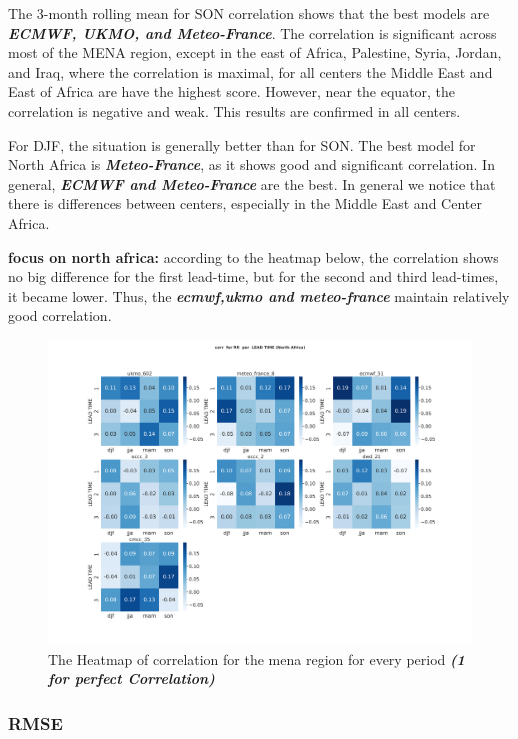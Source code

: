 The 3-month rolling mean for SON correlation shows that the best models are \textbf{\textit{ECMWF, UKMO, and Meteo-France}}. The correlation is significant across most of the MENA region, except in the east of Africa, Palestine, Syria, Jordan, and Iraq, where the correlation is maximal, for all centers the Middle East and East of Africa are have the highest score. However, near the equator, the correlation is negative and weak. This results are confirmed in all centers.
 
For DJF, the situation is generally better than for SON. The best model for North Africa is \textbf{\textit{Meteo-France}}, as it shows good and significant correlation. In general, \textbf{\textit{ECMWF and Meteo-France}} are the best. In general we notice that there is differences between centers, especially in the Middle East and Center Africa.

\vspace{1.5cm}

\textbf{focus on north africa:}
according to the heatmap below, the correlation shows no big difference for the first lead-time, but for the second and third lead-times, it became lower. Thus, the \textbf{\textit{ecmwf,ukmo and meteo-france}} maintain relatively good correlation.


\begin{figure}[H]
	\centering
	\includegraphics[scale=0.25]{plots/det/corr/corr_RR_NorthAfrica.png}
	\caption{The Heatmap of correlation for the mena region for every period \textbf{\textit{(1 for perfect Correlation)} }}
\end{figure}


\subsubsection{RMSE}
 
